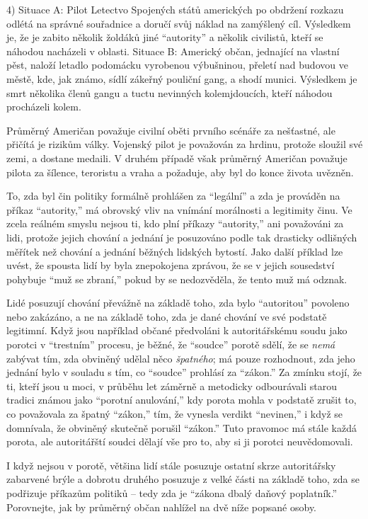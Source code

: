 \documentclass{book}
\begin{document}
4) Situace A: Pilot Letectvo Spojených států amerických po obdržení rozkazu odlétá na správné souřadnice a doručí svůj náklad na zamýšlený cíl. Výsledkem je, že je zabito několik žoldáků jiné \enquote{autority} a několik civilistů, kteří se náhodou nacházeli v oblasti. Situace B: Americký občan, jednající na vlastní pěst, naloží letadlo podomácku vyrobenou výbušninou, přeletí nad budovou ve městě, kde, jak známo, sídlí zákeřný pouliční gang, a shodí munici. Výsledkem je smrt několika členů gangu a tuctu nevinných kolemjdoucích, kteří náhodou procházeli kolem.

Průměrný Američan považuje civilní oběti prvního scénáře za nešťastné, ale přičítá je rizikům války. Vojenský pilot je považován za hrdinu, protože sloužil své zemi, a dostane medaili. V druhém případě však průměrný Američan považuje pilota za šílence, teroristu a vraha a požaduje, aby byl do konce života uvězněn.

To, zda byl čin politiky formálně prohlášen za \enquote{legální} a zda je prováděn na příkaz \enquote{autority,} má obrovský vliv na vnímání morálnosti a legitimity činu. Ve zcela reálném smyslu nejsou ti, kdo plní příkazy \enquote{autority,} ani považováni za lidi, protože jejich chování a jednání je posuzováno podle tak drasticky odlišných měřítek než chování a jednání běžných lidských bytostí. Jako další příklad lze uvést, že spousta lidí by byla znepokojena zprávou, že se v jejich sousedství pohybuje \enquote{muž se zbraní,} pokud by se nedozvěděla, že tento muž má odznak.

Lidé posuzují chování převážně na základě toho, zda bylo \enquote{autoritou} povoleno nebo zakázáno, a ne na základě toho, zda je dané chování ve své podstatě legitimní. Když jsou například občané předvoláni k autoritářskému soudu jako porotci v \enquote{trestním} procesu, je běžné, že \enquote{soudce} porotě sdělí, že se \emph{nemá} zabývat tím, zda obviněný udělal něco \emph{špatného}; má pouze rozhodnout, zda jeho jednání bylo v souladu s tím, co \enquote{soudce} prohlásí za \enquote{zákon.} Za zmínku stojí, že ti, kteří jsou u moci, v průběhu let záměrně a metodicky odbourávali starou tradici známou jako \enquote{porotní anulování,} kdy porota mohla v podstatě zrušit to, co považovala za špatný \enquote{zákon,} tím, že vynesla verdikt \enquote{nevinen,} i když se domnívala, že obviněný skutečně porušil \enquote{zákon.} Tuto pravomoc má stále každá porota, ale autoritářští soudci dělají vše pro to, aby si ji porotci neuvědomovali.

I když nejsou v porotě, většina lidí stále posuzuje ostatní skrze autoritářsky zabarvené brýle a dobrotu druhého posuzuje z velké části na základě toho, zda se podřizuje příkazům politiků -- tedy zda je \enquote{zákona dbalý daňový poplatník.} Porovnejte, jak by průměrný občan nahlížel na dvě níže popsané osoby.
\end{document}
